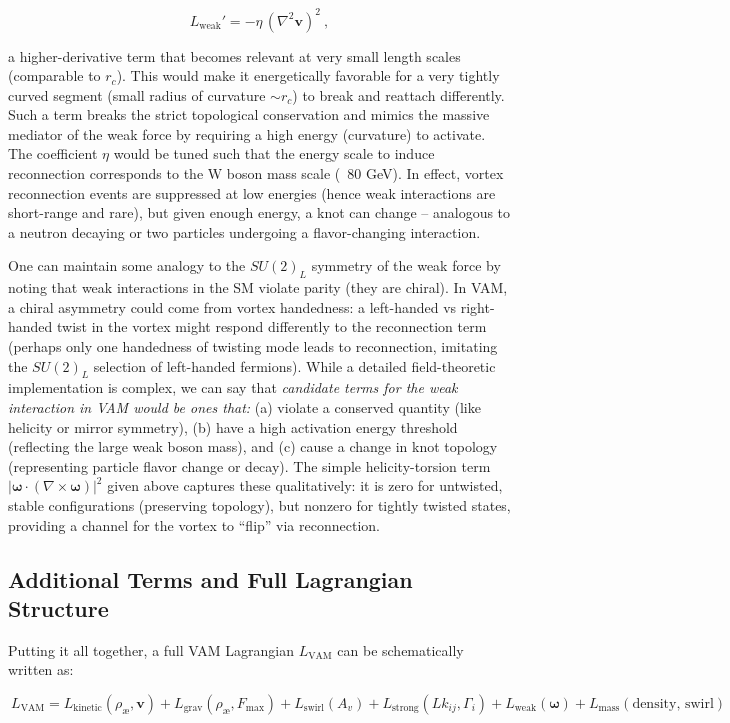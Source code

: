 \documentclass[a4paper,12pt]{article}
\begin{document}
        \[
        L_{\text{weak}}' = -\eta\,(\nabla^2 \mathbf{v})^2~,
        \]

        a higher-derivative term that becomes relevant at very small length scales (comparable to $r_c$). This would make it energetically favorable for a very tightly curved segment (small radius of curvature $\sim r_c$) to break and reattach differently. Such a term breaks the strict topological conservation and mimics the massive mediator of the weak force by requiring a high energy (curvature) to activate. The coefficient $\eta$ would be tuned such that the energy scale to induce reconnection corresponds to the W boson mass scale (~80 GeV). In effect, vortex reconnection events are suppressed at low energies (hence weak interactions are short-range and rare), but given enough energy, a knot can change – analogous to a neutron decaying or two particles undergoing a flavor-changing interaction.
        
        
        One can maintain some analogy to the $SU(2)_L$ symmetry of the weak force by noting that weak interactions in the SM violate parity (they are chiral). In VAM, a chiral asymmetry could come from vortex handedness: a left-handed vs right-handed twist in the vortex might respond differently to the reconnection term (perhaps only one handedness of twisting mode leads to reconnection, imitating the $SU(2)_L$ selection of left-handed fermions). While a detailed field-theoretic implementation is complex, we can say that \textit{candidate terms for the weak interaction in VAM would be ones that:} (a) violate a conserved quantity (like helicity or mirror symmetry), (b) have a high activation energy threshold (reflecting the large weak boson mass), and (c) cause a change in knot topology (representing particle flavor change or decay). The simple helicity-torsion term $|\mathbf{\omega}\cdot(\nabla\times\mathbf{\omega})|^2$ given above captures these qualitatively: it is zero for untwisted, stable configurations (preserving topology), but nonzero for tightly twisted states, providing a channel for the vortex to “flip” via reconnection.

        \subsection{Additional Terms and Full Lagrangian Structure}
        Putting it all together, a full VAM Lagrangian $L_{\text{VAM}}$ can be schematically written as:


        \begin{equation}
            \boxed{\ L_{\text{VAM}} = L_{\text{kinetic}}(\rho_{\text{\ae}},\mathbf{v}) + L_{\text{grav}}(\rho_{\text{\ae}},F_{\max}) + L_{\text{swirl}}(A_v) + L_{\text{strong}}(Lk_{ij}, \Gamma_i) + L_{\text{weak}}(\mathbf{\omega}) + L_{\text{mass}}(\text{density, swirl})}
        \end{equation}
\end{document}
